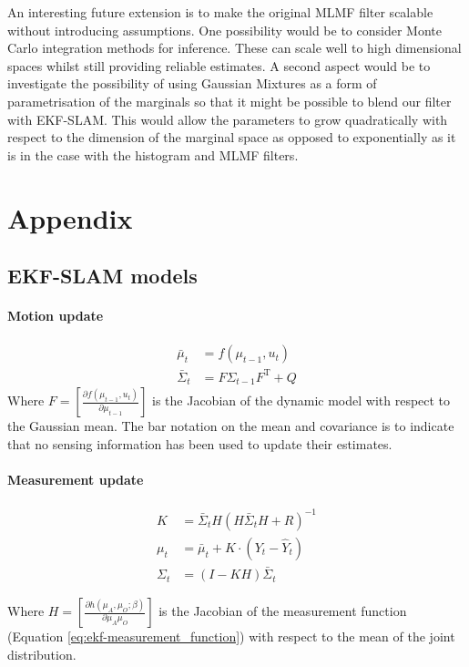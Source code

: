 An interesting future extension is to make the original MLMF filter scalable without introducing assumptions.
One possibility would be to consider Monte Carlo integration methods for inference. These can scale well to high dimensional 
spaces whilst still providing reliable estimates. A second aspect would be to investigate the possibility
of using Gaussian Mixtures as a form of parametrisation of the marginals so that it might be possible to blend our filter with  
EKF-SLAM. This would allow the parameters to grow quadratically with respect to the dimension of the marginal space as opposed to
exponentially as it is in the case with the histogram and MLMF filters.



\section{Appendix}\label{ch5:appendix}

\subsection{EKF-SLAM models}

\paragraph{Motion update}
\begin{align}
  \bar{\mu}_t      &= f(\mu_{t-1},u_t)\\
  \bar{\Sigma}_{t} &= F \Sigma_{t-1} F^{\mathrm{T}} + Q
\end{align}
Where $F = \left[\frac{\partial f(\mu_{t-1},u_t)}{\partial \mu_{t-1} } \right]$ is the Jacobian of the dynamic model with respect to the Gaussian mean. The 
bar notation on the mean and covariance is to indicate that no sensing information has been used to update their estimates.

\paragraph{Measurement update}

\begin{align}
   K    &= \bar{\Sigma}_{t} H (H \bar{\Sigma}_{t} H + R)^{-1} \\
  \mu_t &= \bar{\mu}_t + K \cdot (Y_t - \hat{Y}_t)\\
  \Sigma_t &= (I - KH) \bar{\Sigma}_{t}
\end{align}
 
Where $H = \left[\frac{\partial h(\mu_A,\mu_O;\beta)}{\partial \mu_A\mu_O}\right]$ is the Jacobian of the measurement function (Equation \ref{eq:ekf-measurement_function})  
with respect to the mean of the joint distribution. 

